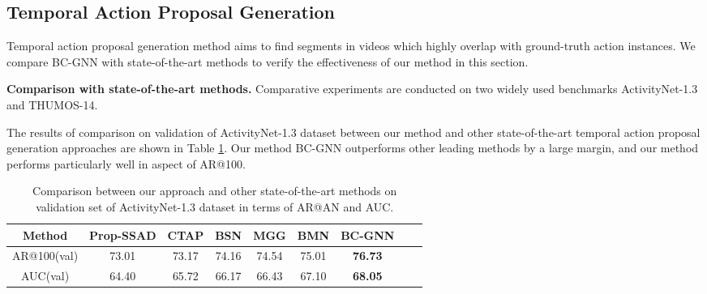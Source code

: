 \documentclass[runningheads]{llncs}
\begin{document}
\subsection{Temporal Action Proposal Generation}
Temporal action proposal generation method aims to find segments in videos which highly overlap with ground-truth action instances. We compare BC-GNN with state-of-the-art methods to verify the effectiveness of our method in this section.


\noindent\textbf{Comparison with state-of-the-art methods.}
Comparative experiments are conducted on two widely used benchmarks ActivityNet-1.3 and THUMOS-14.

The results of comparison on validation of ActivityNet-1.3 dataset between our method and other state-of-the-art temporal action proposal generation approaches are shown in Table \ref{anet auc table}. Our method BC-GNN outperforms other leading methods by a large margin, and our method performs particularly well in aspect of AR@100.

\begin{table}
\setlength{\abovecaptionskip}{-.5cm}
\setlength{\belowcaptionskip}{-.1cm}
\caption{Comparison between our approach and other state-of-the-art methods on validation set of ActivityNet-1.3 dataset in terms of AR@AN and AUC.}
\setlength{\tabcolsep}{1mm}
\begin{center}
\begin{tabular}{ccccccccc}

\hline
Method       &Prop-SSAD \cite{SSAD} &CTAP \cite{CTAP}  & BSN \cite{BSN}   &MGG \cite{MGG}  &BMN \cite{BMN}  & BC-GNN  \\ \hline
AR@100(val)  & 73.01     & 73.17 & 74.16 & 74.54 & 75.01 & \textbf{76.73} \\
AUC(val)    & 64.40     & 65.72 & 66.17 & 66.43 & 67.10 & \textbf{68.05} \\ \hline

\end{tabular}
\end{center}
\label{anet auc table}
\end{table}
\end{document}
